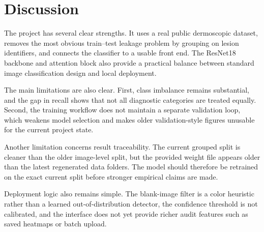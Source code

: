 \section{Discussion}

The project has several clear strengths. It uses a real public dermoscopic dataset, removes the most obvious train--test leakage problem by grouping on lesion identifiers, and connects the classifier to a usable front end. The ResNet18 backbone and attention block also provide a practical balance between standard image classification design and local deployment.

The main limitations are also clear. First, class imbalance remains substantial, and the gap in recall shows that not all diagnostic categories are treated equally. Second, the training workflow does not maintain a separate validation loop, which weakens model selection and makes older validation-style figures unusable for the current project state.

Another limitation concerns result traceability. The current grouped split is cleaner than the older image-level split, but the provided weight file appears older than the latest regenerated data folders. The model should therefore be retrained on the exact current split before stronger empirical claims are made.

Deployment logic also remains simple. The blank-image filter is a color heuristic rather than a learned out-of-distribution detector, the confidence threshold is not calibrated, and the interface does not yet provide richer audit features such as saved heatmaps or batch upload.
